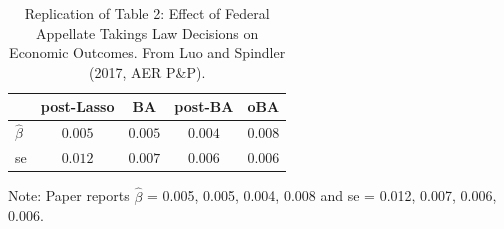 \begin{table}[h]
\centering
\caption{Replication of Table 2: Effect of Federal Appellate Takings Law Decisions
on Economic Outcomes. From Luo and Spindler (2017, AER P\&P).}
\begin{tabular*}{\textwidth}{@{\extracolsep{\fill}}lcccc}
\hline
 & post-Lasso & BA & post-BA & oBA \\
\hline
$\hat{\beta}$ & $0.005$ & $0.005$ & $0.004$ & $0.008$ \\
se             & $0.012$ & $0.007$ & $0.006$ & $0.006$ \\
\hline
\end{tabular*}
\begin{minipage}{\textwidth}
\footnotesize Note: Paper reports $\hat{\beta}$ = 0.005, 0.005, 0.004, 0.008
and se = 0.012, 0.007, 0.006, 0.006.
\end{minipage}
\label{tab:table2}
\end{table}
